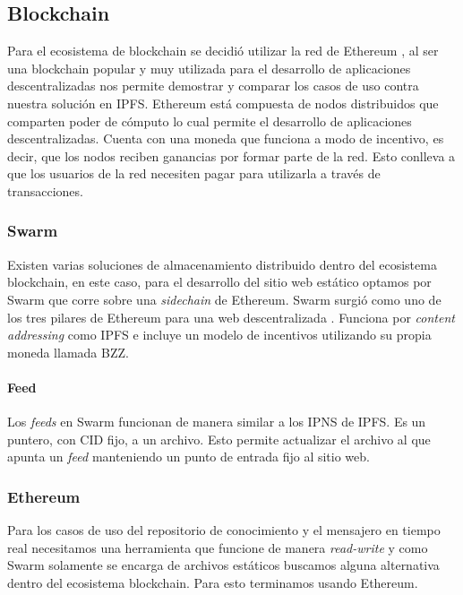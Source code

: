 \subsection{Blockchain}

Para el ecosistema de blockchain se decidió utilizar la red de Ethereum \cite{wood2014ethereum}, al ser una blockchain popular y muy utilizada para el desarrollo de aplicaciones descentralizadas nos permite demostrar y comparar los casos de uso contra nuestra solución en IPFS. Ethereum está compuesta de nodos distribuidos que comparten poder de cómputo lo cual permite el desarrollo de aplicaciones descentralizadas. Cuenta con una moneda que funciona a modo de incentivo, es decir, que los nodos reciben ganancias por formar parte de la red. Esto conlleva a que los usuarios de la red necesiten pagar para utilizarla a través de transacciones.

\subsubsection{Swarm}

Existen varias soluciones de almacenamiento distribuido dentro del ecosistema blockchain, en este caso, para el desarrollo del sitio web estático optamos por Swarm \cite{team2021swarm} que corre sobre una \textit{sidechain} de Ethereum. Swarm surgió como uno de los tres pilares de Ethereum para una web descentralizada \parencite{swarm-origin}. Funciona por \textit{content addressing} como IPFS e incluye un modelo de incentivos utilizando su propia moneda llamada BZZ.

\paragraph{Feed}

Los \textit{feeds} en Swarm funcionan de manera similar a los IPNS de IPFS. Es un puntero, con CID fijo, a un archivo. Esto permite actualizar el archivo al que apunta un \textit{feed} manteniendo un punto de entrada fijo al sitio web.

\subsubsection{Ethereum}

Para los casos de uso del repositorio de conocimiento y el mensajero en tiempo real necesitamos una herramienta que funcione de manera \textit{read-write} y como Swarm solamente se encarga de archivos estáticos buscamos alguna alternativa dentro del ecosistema blockchain. Para esto terminamos usando Ethereum.

